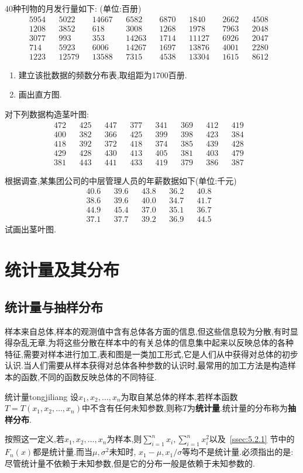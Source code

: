 \begin{xiti}
\item 40种刊物的月发行量如下: (单位:百册)
\begin{align*}
5954&&5022&&14667&&6582&&6870&&1840&&2662&&4508&\\
1208&&3852&&618&&3008&&1268&&1978&&7963&&2048&\\
3077&&993&&353&&14263&&1714&&11127&&6926&&2047&\\
714&&5923&&6006&&14267&&1697&&13876&&4001&&2280&\\
1223&&12579&&13588&&7315&&4538&&13304&&1615&&8612&
\end{align*}
\begin{enumerate}
\item 建立该批数据的频数分布表,取组距为1700百册.
\item 画出直方图.
\end{enumerate}
\item 对下列数据构造茎叶图:
\begin{align*}
472&&425&&447&&377&&341&&369&&412&&419&\\
400&&382&&366&&425&&399&&398&&423&&384&\\
418&&392&&372&&418&&374&&385&&439&&428&\\
429&&428&&430&&413&&405&&381&&403&&479&\\
381&&443&&441&&433&&419&&379&&386&&387&
\end{align*}
\item 根据调查,某集团公司的中层管理人员的年薪数据如下(单位:千元)
\begin{align*}
40.6&&39.6&&43.8&&36.2&&40.8&\\
38.6&&39.6&&40.0&&34.7&&41.7&\\
44.9&&45.4&&37.0&&35.1&&36.7&\\
37.1&&37.7&&39.2&&36.9&&44.5&
\end{align*}
试画出茎叶图.
\end{xiti}
\section{统计量及其分布}
\subsection{统计量与抽样分布}
样本来自总体,样本的观测值中含有总体各方面的信息,但这些信息较为分散,有时显得杂乱无章,为将这些分散在样本中的有关总体的信息集中起来以反映总体的各种特征,需要对样本进行加工,表和图是一类加工形式,它是人们从中获得对总体的初步认识.当人们需要从样本获得对总体各种参数的认识时,最常用的加工方法是构造样本的函数,不同的函数反映总体的不同特征.
\begin{definition}{统计量}{tongjiliang}
设$x_1,x_2,\dotsc,x_n$为取自某总体的样本,若样本函数$T=T(x_1,x_2,\dotsc,x_n)$中不含有任何未知参数,则称$T$为\textbf{统计量}.统计量的分布称为\textbf{抽样分布}.
\end{definition}
按照这一定义,若$x_1,x_2,\dotsc,x_n$为样本,则$\sum_{i=1}^nx_i,\sum_{i=1}^nx_i^2$以及~\ref{ssec:5.2.1} 节中的$F_n(x)$都是统计量.而当$\mu,\sigma^2$未知时, $x_1-\mu,x_1/\sigma$等均不是统计量.必须指出的是: 尽管统计量不依赖于未知参数,但是它的分布一般是依赖于未知参数的.

